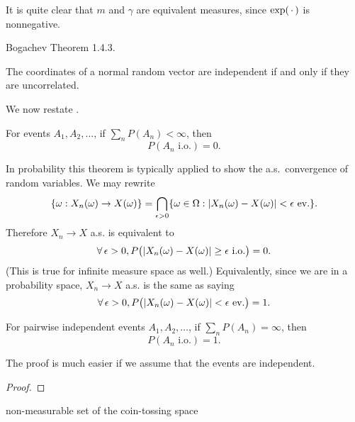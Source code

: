 It is quite clear that $m$ and $\gamma$ are equivalent measures, since $\exp(\,\cdot\,)$ is nonnegative.

Bogachev Theorem 1.4.3.

The coordinates of a normal random vector are independent if and only if they are uncorrelated.

We now restate .

\begin{namedthm} \label{thm:BorelCantelli-1-prob}
    For events $A_1,A_2,\dotsc$, if $\sum_n P(A_n) < \infty$, then \[
        P(A_n \text{ i.o.}) = 0.
    \]
\end{namedthm}

In probability this theorem is typically applied to show the a.s.\ convergence of random variables. We may rewrite \[
    \{\omega: X_n(\omega) \to X(\omega)\} = \bigcap_{\epsilon >0}\{\omega \in \Omega: \lvert X_n(\omega) - X(\omega) \rvert < \epsilon\text{ ev.}\}.
\] Therefore $X_n \to X$ a.s. is equivalent to \[
    \forall\,\epsilon >0, P\bigl(\lvert X_n(\omega) - X(\omega) \rvert \geq \epsilon\text{ i.o.}\bigr) = 0.
\] (This is true for infinite measure space as well.) Equivalently, since we are in a probability space, $X_n \to X$ a.s. is the same as saying \[
    \forall\,\epsilon >0, P\bigl(\lvert X_n(\omega) - X(\omega) \rvert < \epsilon\text{ ev.}\bigr) = 1.
\]

\begin{namedthm}
    For pairwise independent events $A_1,A_2,\dotsc$, if $\sum_n P(A_n) = \infty$, then \[
        P(A_n \text{ i.o.}) = 1.
    \]
\end{namedthm}

The proof is much easier if we assume that the events are independent.

\begin{proof}
    
\end{proof}

non-measurable set of the coin-tossing space